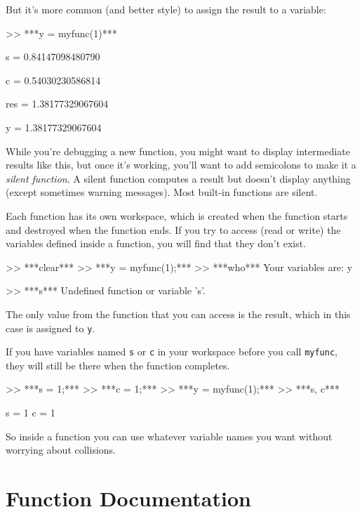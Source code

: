 But it's more common (and better style) to assign the result to
a variable:

\begin{code}
>> ***y = myfunc(1)***

s = 0.84147098480790

c = 0.54030230586814

res = 1.38177329067604

y = 1.38177329067604
\end{code}

While you're debugging a new function, you might want to display
intermediate results like this, but once it's working, you'll want
to add semicolons to make it a {\em silent function}.  A silent function
computes a result but doesn't display
anything (except sometimes warning messages). Most built-in
functions are silent.


Each function has its own workspace, which is created when the
function starts and destroyed when the function ends.  If you try to
access (read or write) the variables defined inside a function, you
will find that they don't exist.

\begin{code}
>> ***clear***
>> ***y = myfunc(1);***
>> ***who***
Your variables are: y

>> ***s***
Undefined function or variable 's'.
\end{code}

The only value from the function that you can access is the result,
which in this case is assigned to \lstinline{y}.

If you have variables named \lstinline{s} or \lstinline{c} in your workspace
before you call \lstinline{myfunc}, they will still be there when the
function completes.

\begin{code}
>> ***s = 1;***
>> ***c = 1;***
>> ***y = myfunc(1);***
>> ***s, c***

s = 1
c = 1
\end{code}

So inside a function you can use whatever variable names you
want without worrying about collisions.



\section{Function Documentation}

